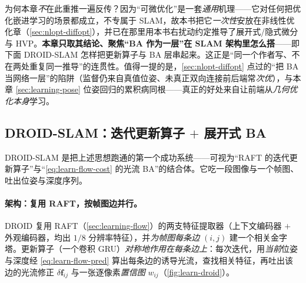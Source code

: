 \begin{insight}
为何本章\emph{不}在此重推一遍反传？因为“可微优化”是一套\emph{通用}机理——它对任何把优化嵌进学习的场景都成立，不专属于 SLAM，故本书把它\emph{一次性}安放在非线性优化章（\cref{sec:nlopt-diffopt}），并已在那里用本书右扰动约定推导了展开式/隐式微分与 HVP。\textbf{本章只取其结论、聚焦“BA 作为一层”在 SLAM 架构里怎么搭}——即下面 DROID-SLAM 怎样把更新算子与 BA 层串起来。这正是“同一个作者写、不在两处重复同一推导”的连贯性。值得一提的是，\cref{sec:nlopt-diffopt} 点过的“把 BA 当网络一层”的陷阱（监督仍来自真值位姿、未真正双向连接前后端常\emph{次优}），与本章 \cref{sec:learning-pose} 位姿回归的累积病同根——真正的好处来自让前端从\emph{几何优化本身}学习。
\end{insight}

\subsection{DROID-SLAM：迭代更新算子 \texorpdfstring{$+$}{+} 展开式 BA}
\label{sec:learning-diffba-droid}

DROID-SLAM\cite{teed2021droid} 是把上述思想跑通的第一个成功系统——可视为“RAFT 的迭代更新算子”与“\cref{eq:learn-flow-cost} 的光流 BA”的结合体。它吃一段图像与一个帧图、吐出位姿与深度序列。

\paragraph{架构：复用 RAFT，按帧图边并行。}
DROID 复用 RAFT（\cref{sec:learning-flow}）的两支特征提取器（上下文编码器 $+$ 外观编码器，均出 $1/8$ 分辨率特征），并\emph{为帧图每条边} $(i,j)$ 建一个相关金字塔。更新算子（一个卷积 GRU）\emph{对称地作用在每条边上}：每次迭代，用\emph{当前}位姿与深度经 \cref{eq:learn-flow-pred} 算出每条边的诱导光流，查找相关特征，再吐出该边的光流修正 $\delta\mathbf{f}_{ij}$ 与一张逐像素\emph{置信图} $w_{ij}$（\cref{fig:learn-droid}）。


